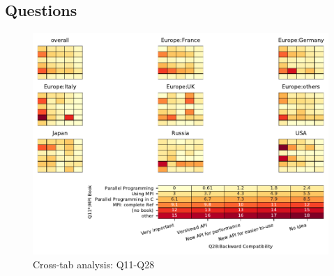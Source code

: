 
\subsection{Questions}


\begin{figure}
\begin{center}
\includegraphics[width=12cm]{../pdfs/Q11-Q28.pdf}
\caption{Cross-tab analysis: Q11-Q28}
\label{fig:Q11-Q28}
\end{center}
\end{figure}

